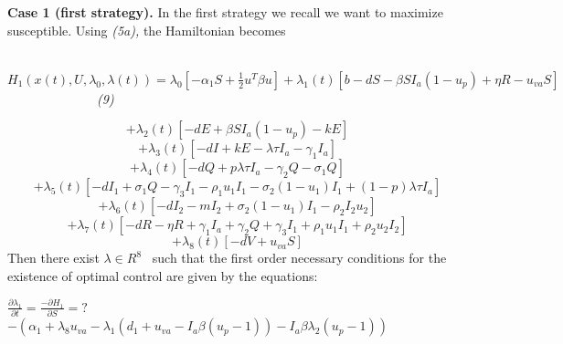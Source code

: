 \documentclass[a4paper]{article}
\begin{document}
\bigskip

\textbf{Case 1 (first strategy). }In the first strategy we recall we want to maximize susceptible. Using \textit{(5a),
}the Hamiltonian becomes

\ \ \ \ \ \  $H_1\left(x\left(t\right),U,\lambda _0,\lambda \left(t\right)\right)=\lambda _0\left[-\alpha _1S+\frac 1
2u^T\mathit{\beta u}\right]+\lambda _1\left(t\right)\left[b-\mathit{dS}-\mathit{\beta
S}I_a\left(1-u_p\right)+\mathit{\eta R}-u_{\mathit{va}}S\right]$\ \ \ \ \ \ \ \ \ \ \ \ \ \ \textit{(9)}

\begin{equation*}
+\lambda _2\left(t\right)\left[-\mathit{dE}+\mathit{\beta S}I_a\left(1-u_p\right)-\mathit{kE}\right]
\end{equation*}
\begin{equation*}
+\lambda _3\left(t\right)\left[-\mathit{dI}+\mathit{kE}-\mathit{\lambda \tau }I_a-\gamma _1I_a\right]
\end{equation*}
\begin{equation*}
+\lambda _4\left(t\right)\left[-\mathit{dQ}+\mathit{p\lambda \tau }I_a-\gamma _2Q-\sigma _1Q\right]
\end{equation*}
\begin{equation*}
+\lambda _5\left(t\right)\left[-dI_1+\sigma _1Q-\gamma _3I_1-\rho _1u_1I_1-\sigma
_2\left(1-u_1\right)I_1+\left(1-p\right)\mathit{\lambda \tau }I_a\right]
\end{equation*}
\begin{equation*}
+\lambda _6\left(t\right)\left[-dI_2-mI_2+\sigma _2\left(1-u_1\right)I_1-\rho _2I_2u_2\right]
\end{equation*}
\begin{equation*}
+\lambda _7\left(t\right)\left[-\mathit{dR}-\mathit{\eta R}+\gamma _1I_a+\gamma _2Q+\gamma _3I_1+\rho _1u_1I_1+\rho
_2u_2I_2\right]
\end{equation*}
\begin{equation*}
+\lambda _8\left(t\right)\left[-\mathit{dV}+u_{\mathit{va}}S\right]
\end{equation*}
Then there exist  $\lambda {\in}R^8$ \ such that the first order necessary conditions for the existence of optimal
control are given by the equations: 

 $\frac{{\partial}\lambda _1}{{\partial}t}=\frac{-{\partial}H_1}{{\partial}S}=?$\  $-\left(\alpha _1+\lambda
_8u_{va}-\lambda _1\left(d_1+u_{va}-I_a\beta \left(u_p-1\right)\right)-I_a\beta \lambda _2\left(u_p-1\right)\right)$
\end{document}
